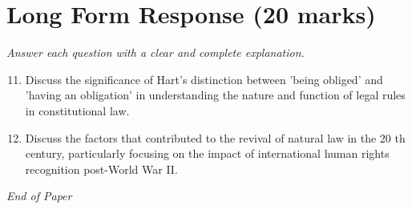 \documentclass[12pt]{article}
\begin{document}
\section*{Long Form Response (20 marks)}
\textit{Answer each question with a clear and complete explanation.}
\begin{enumerate}[label=\arabic*.]
\setcounter{enumi}{10}
\item Discuss the significance of Hart's distinction between 'being obliged' and 'having an obligation' in understanding the nature and function of legal rules in constitutional law.
\item Discuss the factors that contributed to the revival of natural law in the 20 th century, particularly focusing on the impact of international human rights recognition post-World War II.
\end{enumerate}

\vfill
\noindent\textit{End of Paper}
\end{document}
